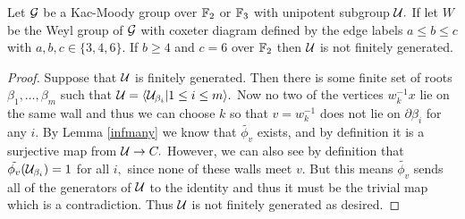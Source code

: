 \documentclass[class=book, crop=false,12 pt]{standalone}
\begin{document}
\begin{theorem} Let $\mathcal{G}$ be a Kac-Moody group over $\mathbb{F}_{2}$ or $\mathbb{F}_{3}$ with unipotent subgroup $\mathcal{U}.$ If let $W$ be the Weyl group of $\mathcal{G}$ with coxeter diagram defined by the edge labels $a\le b\le c$ with $a,b,c\in \{3,4,6\}.$ If $b\ge 4$ and $c=6$ over $\mathbb{F}_{2}$ then $\mathcal{U}$ is not finitely generated.
	\label{notfinitelygenerated}
\end{theorem}
\begin{proof}
	Suppose that $\mathcal{U}$ is finitely generated. Then there is some finite set of roots $\beta_1,\dots,\beta_m$ such that $\mathcal{U}=\langle \mathcal{U}_{\beta_i}|1\le i\le m\rangle.$ Now no two of the vertices $w_k^{-1}x$ lie on the same wall and thus we can choose $k$ so that $v=w_k^{-1}$ does not lie on $\partial \beta_i$ for any $i.$ By Lemma \ref{infmany} we know that $\tilde{\phi_v}$ exists, and by definition it is a surjective map from $\mathcal{U}\to C.$ However, we can also see by definition that $\tilde{\phi_v}(\mathcal{U}_{\beta_i})=1$ for all $i,$ since none of these walls meet $v.$ But this means $\tilde{\phi_v}$ sends all of the generators of $\mathcal{U}$ to the identity and thus it must be the trivial map which is a contradiction. Thus $\mathcal{U}$ is not finitely generated as desired.
\end{proof}
\end{document}
